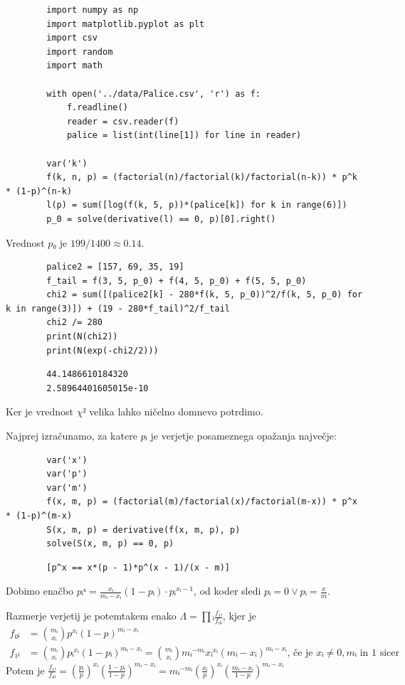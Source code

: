 \documentclass[a4paper]{article}
\begin{document}
\begin{homeworkProblem}
    \solution
    \begin{verbatim}
        import numpy as np
        import matplotlib.pyplot as plt
        import csv
        import random
        import math

        with open('../data/Palice.csv', 'r') as f:
            f.readline()
            reader = csv.reader(f)
            palice = list(int(line[1]) for line in reader)

        var('k')
        f(k, n, p) = (factorial(n)/factorial(k)/factorial(n-k)) * p^k * (1-p)^(n-k)
        l(p) = sum([log(f(k, 5, p))*(palice[k]) for k in range(6)])
        p_0 = solve(derivative(l) == 0, p)[0].right()
    \end{verbatim}
    Vrednost \(p₀\) je \(199/1400 ≈ 0.14\).

    \solution
    \begin{verbatim}
        palice2 = [157, 69, 35, 19]
        f_tail = f(3, 5, p_0) + f(4, 5, p_0) + f(5, 5, p_0)
        chi2 = sum([(palice2[k] - 280*f(k, 5, p_0))^2/f(k, 5, p_0) for k in range(3)]) + (19 - 280*f_tail)^2/f_tail
        chi2 /= 280
        print(N(chi2))
        print(N(exp(-chi2/2)))
    \end{verbatim}
    \begin{verbatim}
        44.1486610184320
        2.58964401605015e-10
    \end{verbatim}

    Ker je vrednost \(χ²\) velika lahko ničelno domnevo potrdimo.

    \pagebreak
    \solution
    Najprej izračunamo, za katere \(pᵢ\) je verjetje posameznega opažanja največje:
    \begin{verbatim}
        var('x')
        var('p')
        var('m')
        f(x, m, p) = (factorial(m)/factorial(x)/factorial(m-x)) * p^x * (1-p)^(m-x)
        S(x, m, p) = derivative(f(x, m, p), p)
        solve(S(x, m, p) == 0, p)
    \end{verbatim}
    \begin{verbatim}
        [p^x == x*(p - 1)*p^(x - 1)/(x - m)]
    \end{verbatim}
    Dobimo enačbo \(pᵢˣ = \frac{xᵢ}{mᵢ-xᵢ}(1-pᵢ)⋅pᵢ^{xᵢ-1}\), od koder sledi \(pᵢ=0 ∨ pᵢ = \frac{x}{m}\).

    Razmerje verjetij je potemtakem enako \(Λ = ∏ᵢ\frac{f₁ᵢ}{f₀ᵢ}\), kjer je 
    \begin{align*}
        f₀ᵢ &= \binom{mᵢ}{xᵢ} p^{xᵢ} (1-p)^{mᵢ-xᵢ}\\
        f₁ᵢ &= \binom{mᵢ}{xᵢ} pᵢ^{xᵢ} (1-pᵢ)^{mᵢ-xᵢ} = \binom{mᵢ}{xᵢ}mᵢ^{-mᵢ}xᵢ^{xᵢ}(mᵢ-xᵢ)^{mᵢ-xᵢ}\text{, če je \(xᵢ ≠ 0, mᵢ\) in \(1\) sicer}
    \end{align*}
    Potem je \(\frac{f₁ᵢ}{f₀ᵢ} = \left(\frac{pᵢ}{p}\right)^{xᵢ}\left(\frac{1-pᵢ}{1-p}\right)^{mᵢ-xᵢ} = mᵢ^{-mᵢ}\left(\frac{xᵢ}{p}\right)^{xᵢ}\left(\frac{mᵢ-xᵢ}{1-p}\right)^{mᵢ-xᵢ}\)


\end{homeworkProblem}
\end{document}
